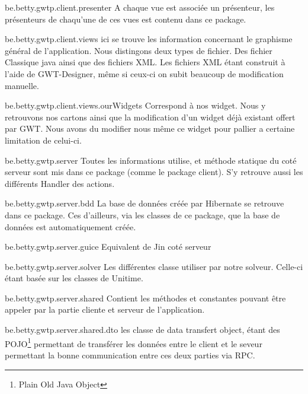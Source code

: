 be.betty.gwtp.client.presenter
A chaque vue est associée un présenteur, les présenteurs de chaqu'une de ces vues est contenu dans ce package.

be.betty.gwtp.client.views
  ici se trouve les information concernant le graphisme général de l'application. Nous distingons deux types de fichier. Des fichier Classique java ainsi que des fichiers XML. Les fichiers XML étant construit à l'aide de GWT-Designer, même si ceux-ci on subit beaucoup de modification manuelle.

be.betty.gwtp.client.views.ourWidgets
Correspond à nos widget. Nous y retrouvons nos cartons ainsi que la modification d'un widget déjà existant offert par GWT. Nous avons du modifier nous même ce widget pour pallier a certaine limitation de celui-ci.

be.betty.gwtp.server
 Toutes les informations utilise, et méthode statique du coté serveur sont mis dans ce package (comme le package client). S'y retrouve aussi les différents Handler des actions.

be.betty.gwtp.server.bdd
 La base de données créée par Hibernate se retrouve dans ce package. Ces d'ailleurs, via les classes de ce package, que la base de données est automatiquement créée.

be.betty.gwtp.server.guice
Equivalent de Jin coté serveur

be.betty.gwtp.server.solver
Les différentes classe utiliser par notre solveur. Celle-ci étant basée sur les classes de Unitime.

be.betty.gwtp.server.shared
Contient les méthodes et constantes pouvant être appeler par la partie cliente et serveur de l'application.

be.betty.gwtp.server.shared.dto
les classe de data transfert object, étant des POJO\footnote{Plain Old Java Object} permettant de transférer les données entre le client et le seveur permettant la bonne communication entre ces deux parties via RPC.

